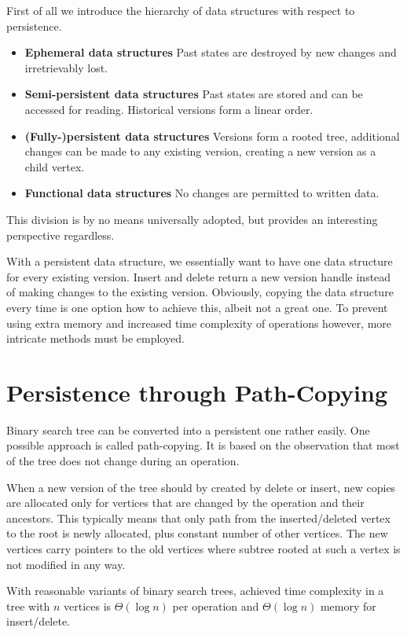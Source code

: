 First of all we introduce the hierarchy of data structures with respect to persistence.

\begin{itemize}
\item {\bfseries Ephemeral data structures} Past states are destroyed by new changes and irretrievably lost.
\item {\bfseries Semi-persistent data structures} Past states are stored and can be accessed for reading. Historical versions form a linear order.
\item {\bfseries (Fully-)persistent data structures} Versions form a rooted tree, additional changes can be made to any existing version, creating a new version as a child vertex.
\item {\bfseries Functional data structures} No changes are permitted to written data.
\end{itemize}

This division is by no means universally adopted, but provides an interesting perspective regardless.

With a persistent data structure, we essentially want to have one data structure for every existing version. Insert and delete return a new version handle instead of making changes to the existing version. Obviously, copying the data structure every time is one option how to achieve this, albeit not a great one. To prevent using extra memory and increased time complexity of operations however, more intricate methods must be employed.
\section{Persistence through Path-Copying}

Binary search tree can be converted into a persistent one rather easily.
One possible approach is called path-copying. It is based on the observation that most of the tree does not change during an operation.

When a new version of the tree should by created by delete or insert, new copies are allocated only for vertices that are changed by the operation and their ancestors. This typically means that only path from the inserted/deleted vertex to the root is newly allocated, plus constant number of other vertices. The new vertices carry pointers to the old vertices where subtree rooted at such a vertex is not modified in any way.

With reasonable variants of binary search trees, achieved time complexity in a tree with $n$ vertices is $\Theta(\log n)$ per operation and $\Theta(\log n)$ memory for insert/delete.

